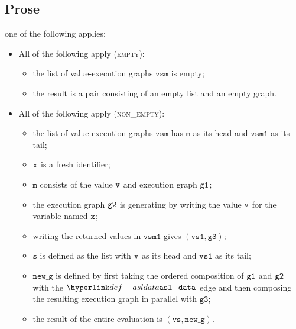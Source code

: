 \documentclass{book}
\newcommand\newg[0]{\texttt{new\_g}}
\newcommand\vm[0]{\texttt{m}}
\newcommand\vs[0]{\texttt{s}}
\newcommand\vvs[0]{\texttt{vs}}
\newcommand\vvsone[0]{\texttt{vs1}}
\newcommand\vgthree[0]{\texttt{g3}}
\newcommand\vvsm[0]{\texttt{vsm}}
\newcommand\vvsmone[0]{\texttt{vsm1}}
\begin{document}
\subsection{Prose}
  one of the following applies:
  \begin{itemize}
  \item All of the following apply (\textsc{empty}):
  \begin{itemize}
    \item the list of value-execution graphs $\vvsm$ is empty;
    \item the result is a pair consisting of an empty list and an empty graph.
  \end{itemize}

  \item All of the following apply (\textsc{non\_empty}):
  \begin{itemize}
    \item the list of value-execution graphs $\vvsm$ has $\vm$ as its head and $\vvsmone$ as its tail;
    \item $\texttt{x}$ is a fresh identifier;
    \item $\vm$ consists of the value $\texttt{v}$ and execution graph $\texttt{g1}$;
    \item the execution graph $\texttt{g2}$ is generating by writing the value $\texttt{v}$ for the variable named $\texttt{x}$;
    \item writing the returned values in $\vvsmone$ gives $(\vvsone, \vgthree)$;
    \item $\vs$ is defined as the list with $\texttt{v}$ as its head and $\vvsone$ as its tail;
    \item $\newg$ is defined by first taking the ordered composition of $\texttt{g1}$ and $\texttt{g2}$ with the $\asldata$ edge
    and then composing the resulting execution graph in parallel with $\vgthree$;
    \item the result of the entire evaluation is $(\vvs, \newg)$.
  \end{itemize}
\end{itemize}

%
\end{document}
